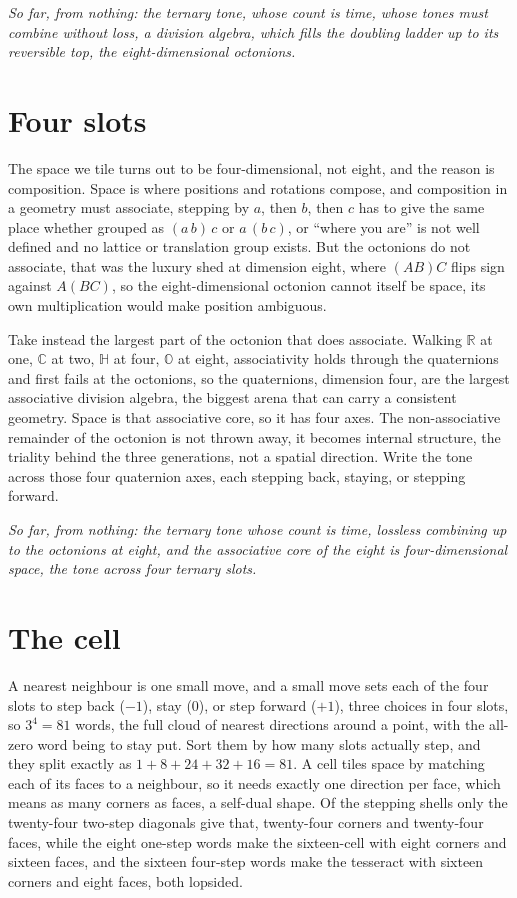 \documentclass{article}
\begin{document}
\emph{So far, from nothing: the ternary tone, whose count is time, whose tones must combine
without loss, a division algebra, which fills the doubling ladder up to its reversible top, the
eight-dimensional octonions.}

\section{Four slots}

The space we tile turns out to be four-dimensional, not eight, and the reason is composition.
Space is where positions and rotations compose, and composition in a geometry must associate,
stepping by $a$, then $b$, then $c$ has to give the same place whether grouped as $(a\,b)\,c$ or
$a\,(b\,c)$, or ``where you are'' is not well defined and no lattice or translation group exists.
But the octonions do not associate, that was the luxury shed at dimension eight, where $(AB)C$
flips sign against $A(BC)$, so the eight-dimensional octonion cannot itself be space, its own
multiplication would make position ambiguous.

Take instead the largest part of the octonion that
does associate. Walking $\mathbb{R}$ at one, $\mathbb{C}$ at two, $\mathbb{H}$ at four,
$\mathbb{O}$ at eight, associativity holds through the quaternions and first fails at the
octonions, so the quaternions, dimension four, are the largest associative division algebra, the
biggest arena that can carry a consistent geometry. Space is that associative core, so it has four
axes. The non-associative remainder of the octonion is not thrown away, it becomes internal
structure, the triality behind the three generations, not a spatial direction. Write the tone
across those four quaternion axes, each stepping back, staying, or stepping forward.

\emph{So far, from nothing: the ternary tone whose count is time, lossless combining up to the
octonions at eight, and the associative core of the eight is four-dimensional space, the tone
across four ternary slots.}

\section{The cell}

A nearest neighbour is one small move, and a small move sets each of the four slots to step back
($-1$), stay ($0$), or step forward ($+1$), three choices in four slots, so $3^4 = 81$ words, the
full cloud of nearest directions around a point, with the all-zero word being to stay put. Sort
them by how many slots actually step, and they split exactly as $1 + 8 + 24 + 32 + 16 = 81$. A
cell tiles space by matching each of its faces to a neighbour, so it needs exactly one direction
per face, which means as many corners as faces, a self-dual shape. Of the stepping shells only the
twenty-four two-step diagonals give that, twenty-four corners and twenty-four faces, while the
eight one-step words make the sixteen-cell with eight corners and sixteen faces, and the sixteen
four-step words make the tesseract with sixteen corners and eight faces, both lopsided.
\end{document}
